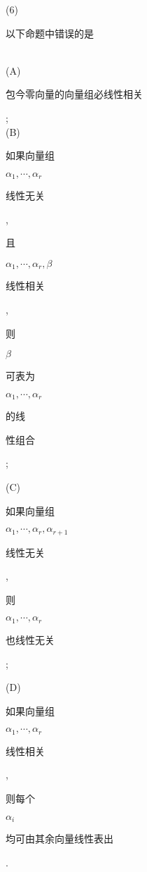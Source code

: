 \documentclass[10pt]{article}
\begin{document}
(6) \begin{CJK}{UTF8}{mj}以下命题中错误的是\end{CJK}\\
(A) \begin{CJK}{UTF8}{mj}包今零向量的向量组必线性相关\end{CJK};\\
(B) \begin{CJK}{UTF8}{mj}如果向量组\end{CJK} $\alpha_{1}, \cdots, \alpha_{r}$ \begin{CJK}{UTF8}{mj}线性无关\end{CJK}, \begin{CJK}{UTF8}{mj}且\end{CJK} $\alpha_{1}, \cdots, \alpha_{r}, \beta$ \begin{CJK}{UTF8}{mj}线性相关\end{CJK}, \begin{CJK}{UTF8}{mj}则\end{CJK} $\beta$ \begin{CJK}{UTF8}{mj}可表为\end{CJK} $\alpha_{1}, \cdots, \alpha_{r}$ \begin{CJK}{UTF8}{mj}的线\end{CJK} \begin{CJK}{UTF8}{mj}性组合\end{CJK};

(C) \begin{CJK}{UTF8}{mj}如果向量组\end{CJK} $\alpha_{1}, \cdots, \alpha_{r}, \alpha_{r+1}$ \begin{CJK}{UTF8}{mj}线性无关\end{CJK}, \begin{CJK}{UTF8}{mj}则\end{CJK} $\alpha_{1}, \cdots, \alpha_{r}$ \begin{CJK}{UTF8}{mj}也线性无关\end{CJK};

(D) \begin{CJK}{UTF8}{mj}如果向量组\end{CJK} $\alpha_{1}, \cdots, \alpha_{r}$ \begin{CJK}{UTF8}{mj}线性相关\end{CJK}, \begin{CJK}{UTF8}{mj}则每个\end{CJK} $\alpha_{i}$ \begin{CJK}{UTF8}{mj}均可由其余向量线性表出\end{CJK}.
\end{document}
